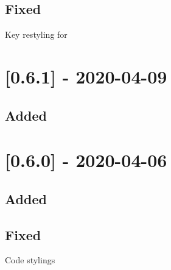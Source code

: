 \subsection{Fixed}

\begin{shortlist}
    \item Key restyling for 
\end{shortlist}

\section{[0.6.1] - 2020-04-09}

\subsection{Added}

\begin{shortlist}
    \item {}
    \item {}
    \item {}
\end{shortlist}

\section{[0.6.0] - 2020-04-06}

\subsection{Added}

\begin{shortlist}
    \item {}
    \item {}
    \item {}
    \item {}
    \item {}
\end{shortlist}

\subsection{Fixed}

\begin{shortlist}
    \item Code stylings
\end{shortlist}

